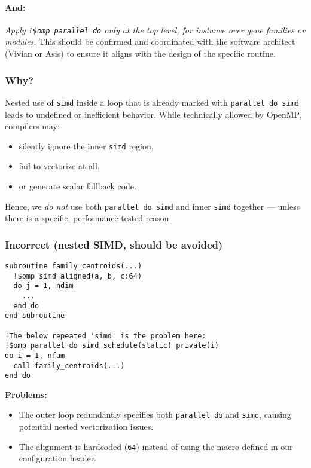 \documentclass{article}
\begin{document}
\paragraph{And:} \emph{Apply \texttt{!\$omp parallel do} only at the top level, for instance over gene families or modules.} This should be confirmed and coordinated with the software architect (Vivian or Asis) to ensure it aligns with the design of the specific routine.

\subsubsection{Why?}

Nested use of \texttt{simd} inside a loop that is already marked with \texttt{parallel do simd} leads to undefined or inefficient behavior. While technically allowed by OpenMP, compilers may:

\begin{itemize}
\item silently ignore the inner \texttt{simd} region,
\item fail to vectorize at all,
\item or generate scalar fallback code.
\end{itemize}

Hence, we \emph{do not} use both \texttt{parallel do simd} and inner \texttt{simd} together — unless there is a specific, performance-tested reason.

\subsubsection{Incorrect (nested SIMD, should be avoided)}

\begin{verbatim}
subroutine family_centroids(...)
  !$omp simd aligned(a, b, c:64)
  do j = 1, ndim
    ...
  end do
end subroutine

!The below repeated 'simd' is the problem here:
!$omp parallel do simd schedule(static) private(i)
do i = 1, nfam
  call family_centroids(...)
end do
\end{verbatim}

\textbf{Problems:}
\begin{itemize}
\item The outer loop redundantly specifies both \texttt{parallel do} and \texttt{simd}, causing potential nested vectorization issues.
\item The alignment is hardcoded (\texttt{64}) instead of using the macro defined in our configuration header.
\end{itemize}
\end{document}
